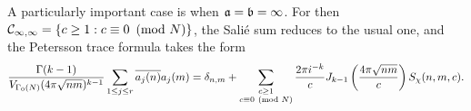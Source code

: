     A particularly important case is when $\mathfrak{a} = \mathfrak{b} = \infty$. For then $\mathcal{C}_{\infty,\infty} = \{c \ge 1:c \equiv 0 \ \left(\text{mod }N\right)\}$, the Sali\'e sum reduces to the usual one, and the Petersson trace formula takes the form
    \[
      \frac{\Gamma(k-1)}{V_{\Gamma_{0}(N)}(4\pi \sqrt{nm})^{k-1}}\sum_{1 \le j \le r}\overline{a_{j}(n)}a_{j}(m) = \delta_{n,m}+\sum_{\substack{c \ge 1 \\ c \equiv 0 \ \left(\text{mod }N\right)}}\frac{2\pi i^{-k}}{c}J_{k-1}\left(\frac{4\pi\sqrt{nm}}{c}\right)S_{\chi}(n,m,c).
    \]
  \section{}